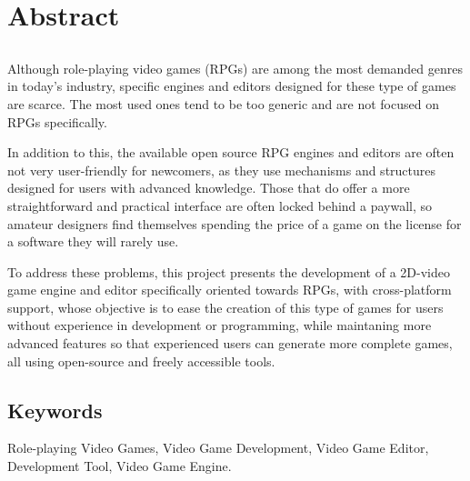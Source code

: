 \chapter*{Abstract}

\section*{\tituloPortadaEngVal}

Although role-playing video games (RPGs) are among the most demanded genres in today's industry, specific engines and editors designed for these type of games are scarce. The most used ones tend to be too generic and are not focused on RPGs specifically.

\smallskip

In addition to this, the available open source RPG engines and editors are often not very user-friendly for newcomers, as they use mechanisms and structures designed for users with advanced knowledge. Those that do offer a more straightforward and practical interface are often locked behind a paywall, so amateur designers find themselves spending the price of a game on the license for a software they will rarely use.

\medskip

To address these problems, this project presents the development of a 2D-video game engine and editor specifically oriented towards RPGs, with cross-platform support, whose objective is to ease the creation of this type of games for users without experience in development or programming, while maintaning more advanced features so that experienced users can generate more complete games, all using open-source and freely accessible tools.


\section*{Keywords}

\noindent Role-playing Video Games, Video Game Development, Video Game Editor, Development Tool, Video Game Engine.



